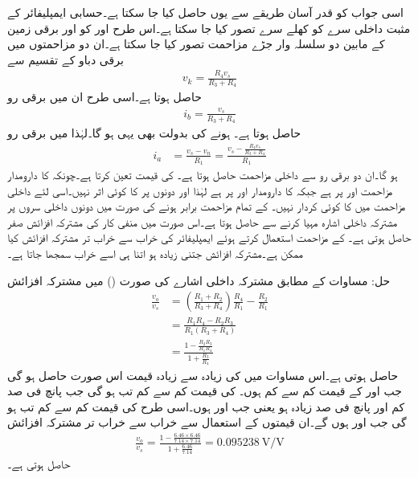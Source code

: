 اسی جواب کو قدر آسان طریقے سے یوں حاصل کیا جا سکتا ہے۔حسابی ایمپلیفائر کے مثبت داخلی سرے  کو کھلے سرے تصور کیا جا سکتا ہے۔اس طرح  اور  کو  اور برقی زمین کے مابین دو سلسلہ وار جڑے مزاحمت تصور کیا جا سکتا ہے۔ان دو مزاحمتوں میں برقی دباو کے تقسیم سے
\begin{align*}
v_k=\frac{R_4 v_s}{R_3+R_4}
\end{align*}
حاصل ہوتا ہے۔اسی طرح ان میں برقی رو
\begin{align*}
i_b=\frac{v_s}{R_3+R_4}
\end{align*}
حاصل ہوتا ہے۔ ہونے کی بدولت  بھی یہی ہو گا۔لہٰذا  میں برقی رو
\begin{align*}
i_a&=\frac{v_s-v_n}{R_1}=\frac{v_s-\frac{R_4 v_s}{R_3+R_4}}{R_1}
\end{align*}
ہو گا۔ان دو برقی رو سے داخلی مزاحمت حاصل ہوتا ہے۔ کی قیمت  تعین کرتا ہے۔چونکہ  کا دارومدار مزاحمت  اور  پر ہے  جبکہ  کا دارومدار  اور  پر ہے لہٰذا  اور  دونوں پر  کا کوئی اثر نہیں۔اسی لئے داخلی مزاحمت میں  کا کوئی کردار نہیں۔
 
 کے تمام مزاحمت برابر ہونے کی صورت میں دونوں داخلی سروں  پر مشترکہ داخلی اشارہ  مہیا کرنے سے  حاصل ہوتا ہے۔اس صورت میں منفی کار کی مشترکہ افزائش صفر حاصل ہوتی ہے۔ کے مزاحمت استعمال کرتے ہوئے ایمپلیفائر کی خراب سے خراب تر مشترکہ افزائش کیا ممکن ہے۔مشترکہ افزائش جتنی زیادہ ہو اتنا ہی اسے خراب سمجھا جاتا ہے۔ 

حل:
مساوات  کے مطابق مشترکہ داخلی اشارے کی صورت () میں  مشترکہ افزائش
\begin{align*}
\frac{v_o}{v_s}&=\left(\frac{R_1+R_2}{R_3+R_4} \right) \frac{R_4}{R_1}-\frac{R_2}{R_1}\\
&=\frac{R_1 R_4-R_2R_3}{R_1 \left(R_3+R_4 \right)}\\
&=\frac{1-\frac{R_2R_3}{R_1 R_4}}{1+\frac{R_3}{R_4}}
\end{align*}
حاصل ہوتی ہے۔اس مساوات میں  کی زیادہ سے زیادہ قیمت اس صورت حاصل ہو گی جب  اور    کے قیمت کم سے کم ہوں۔ کی قیمت کم سے کم تب ہو گی جب  پانچ فی صد کم اور  پانچ فی صد زیادہ ہو یعنی جب  اور  ہوں۔اسی طرح  کی قیمت کم سے کم تب ہو گی جب  اور  ہوں گے۔ان قیمتوں کے استعمال سے خراب سے خراب تر مشترکہ افزائش
\begin{align*}
\frac{v_o}{v_s}=\frac{1-\frac{6.46 \times 6.46}{7.14 \times 7.14}}{1+\frac{6.46}{7.14}}=\SI{0.095238}{\volt \per \volt}
\end{align*}
حاصل ہوتی ہے۔

